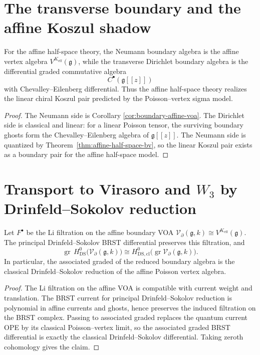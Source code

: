 \section{The transverse boundary and the affine Koszul shadow}

\begin{corollary}\label{cor:affine-koszul-shadow}
For the affine half-space theory, the Neumann boundary algebra is the affine vertex algebra
$V^{K_{\mathrm{eff}}}(\mathfrak g)$, while the transverse Dirichlet boundary algebra is the differential graded
commutative algebra
\[
C^{\bullet}(\mathfrak g[[z]])
\]
with Chevalley--Eilenberg differential.
Thus the affine half-space theory realizes the linear chiral Koszul pair predicted by the Poisson--vertex sigma
model.
\end{corollary}

\begin{proof}
The Neumann side is Corollary \ref{cor:boundary-affine-voa}. The Dirichlet side is classical and linear: for a
linear Poisson tensor, the surviving boundary ghosts form the Chevalley--Eilenberg algebra of $\mathfrak g[[z]]$.
The Neumann side is quantized by Theorem~\ref{thm:affine-half-space-bv}, so the linear Koszul pair
exists as a boundary pair for the affine half-space model.
\end{proof}

\section{Transport to Virasoro and \texorpdfstring{$W_3$}{W3} by Drinfeld--Sokolov reduction}

\begin{proposition}\label{prop:filtered-ds}
Let $F^{\bullet}$ be the Li filtration on the affine boundary VOA
$\mathcal V_{\partial}(\mathfrak g,k)\cong V^{K_{\mathrm{eff}}}(\mathfrak g)$.
The principal Drinfeld--Sokolov BRST differential preserves this filtration, and
\[
\operatorname{gr}\,H^0_{\mathrm{DS}}\bigl(\mathcal V_{\partial}(\mathfrak g,k)\bigr)
\cong
H^0_{\mathrm{DS,cl}}\bigl(\operatorname{gr}\mathcal V_{\partial}(\mathfrak g,k)\bigr).
\]
In particular, the associated graded of the reduced boundary algebra is the classical Drinfeld--Sokolov
reduction of the affine Poisson vertex algebra.
\end{proposition}

\begin{proof}
The Li filtration on the affine VOA is compatible with current weight and translation. The BRST current for
principal Drinfeld--Sokolov reduction is polynomial in affine currents and ghosts, hence preserves the induced
filtration on the BRST complex. Passing to associated graded replaces the quantum current OPE by its classical
Poisson--vertex limit, so the associated graded BRST differential is exactly the classical Drinfeld--Sokolov
differential. Taking zeroth cohomology gives the claim.
\end{proof}

